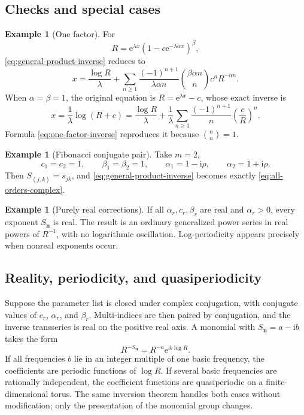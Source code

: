 \documentclass[11pt,oneside]{article}
\numberwithin{equation}{section}
\theoremstyle{plain}
\theoremstyle{definition}
\newtheorem{example}[theorem]{Example}
\theoremstyle{remark}
\newcommand{\e}{\mathrm e}
\newcommand{\ii}{\mathrm i}
\newcommand{\multi}[1]{\bm{#1}}
\begin{document}
\subsection{Checks and special cases}

\begin{example}[One factor]\label{ex:one-factor}
For
\[
 R=\e^{\lambda x}(1-c\e^{-\lambda\alpha x})^\beta,
\]
\cref{eq:general-product-inverse} reduces to
\begin{equation}\label{eq:one-factor-inverse}
 x=\frac{\log R}{\lambda}
 +\sum_{n\ge1}
 \frac{(-1)^{n+1}}{\lambda\alpha n}
 \binom{\beta\alpha n}{n}c^nR^{-\alpha n}.
\end{equation}
When \(\alpha=\beta=1\), the original equation is
\(R=\e^{\lambda x}-c\), whose exact inverse is
\[
 x=\frac1\lambda\log(R+c)
 =\frac{\log R}{\lambda}
 +\frac1\lambda\sum_{n\ge1}\frac{(-1)^{n+1}}n
 \left(\frac cR\right)^n.
\]
Formula \cref{eq:one-factor-inverse} reproduces it because
\(\binom nn=1\).
\end{example}

\begin{example}[Fibonacci conjugate pair]\label{ex:fib-product}
Take \(m=2\),
\[
 c_1=c_2=1,
 \qquad \beta_1=\beta_2=1,
 \qquad \alpha_1=1-\ii\rho,
 \qquad \alpha_2=1+\ii\rho.
\]
Then \(S_{(j,k)}=s_{jk}\), and
\cref{eq:general-product-inverse} becomes exactly
\cref{eq:all-orders-complex}.
\end{example}

\begin{example}[Purely real corrections]\label{ex:real-product}
If all \(\alpha_r,c_r,\beta_r\) are real and
\(\alpha_r>0\), every exponent \(S_{\multi n}\) is real.  The result is an
ordinary generalized power series in real powers of \(R^{-1}\), with no
logarithmic oscillation.  Log-periodicity appears precisely when nonreal
exponents occur.
\end{example}

\subsection{Reality, periodicity, and quasiperiodicity}

Suppose the parameter list is closed under complex conjugation, with
conjugate values of \(c_r\), \(\alpha_r\), and \(\beta_r\).  Multi-indices
are then paired by conjugation, and the inverse transseries is real on the
positive real axis.  A monomial with
\(
 S_{\multi n}=a-\ii b
\) takes the form
\begin{equation}\label{eq:general-log-periodic-monomial}
 R^{-S_{\multi n}}=R^{-a}\e^{\ii b\log R}.
\end{equation}
If all frequencies \(b\) lie in an integer multiple of one basic frequency,
the coefficients are periodic functions of \(\log R\).  If several basic
frequencies are rationally independent, the coefficient functions are
quasiperiodic on a finite-dimensional torus.  The same inversion theorem
handles both cases without modification; only the presentation of the
monomial group changes.
\end{document}
